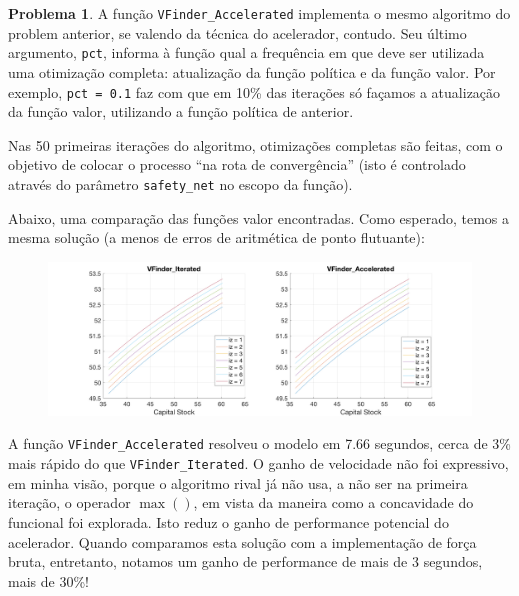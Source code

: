 \documentclass[11pt]{article}
\theoremstyle{definition}
\theoremstyle{definition}
\newtheorem{problema}{Problema}
\theoremstyle{solution}
\begin{document}
	\begin{problema}
		A função \texttt{VFinder\_Accelerated} implementa o mesmo algoritmo do problem anterior, se valendo da técnica do acelerador, contudo. Seu último argumento, \texttt{pct}, informa à função qual a frequência em que deve ser utilizada uma otimização completa: atualização da função política e da função valor. Por exemplo, \texttt{pct = 0.1} faz com que em 10\% das iterações só façamos a atualização da função valor, utilizando a função política de anterior. 
		
		Nas 50 primeiras iterações do algoritmo, otimizações completas são feitas, com o objetivo de colocar o processo ``na rota de convergência'' (isto é controlado através do parâmetro \texttt{safety\_net} no escopo da função).
		
		Abaixo, uma comparação das funções valor encontradas. Como esperado, temos a mesma solução (a menos de erros de aritmética de ponto flutuante):
		\begin{figure}[h!]
			\centering
			\includegraphics[scale = 0.2]{iterated_vs_accelerated}
		\end{figure}
		
		A função \texttt{VFinder\_Accelerated} resolveu o modelo em 7.66 segundos, cerca de 3\% mais rápido do que \texttt{VFinder\_Iterated}. O ganho de velocidade não foi expressivo, em minha visão, porque o algoritmo rival já não usa, a não ser na primeira iteração, o operador $\max()$, em vista da maneira como a concavidade do funcional foi explorada. Isto reduz o ganho de performance potencial do acelerador. Quando comparamos esta solução com a implementação de força bruta, entretanto, notamos um ganho de performance de mais de 3 segundos, mais de 30\%!
		
		
	\end{problema}
\end{document}
